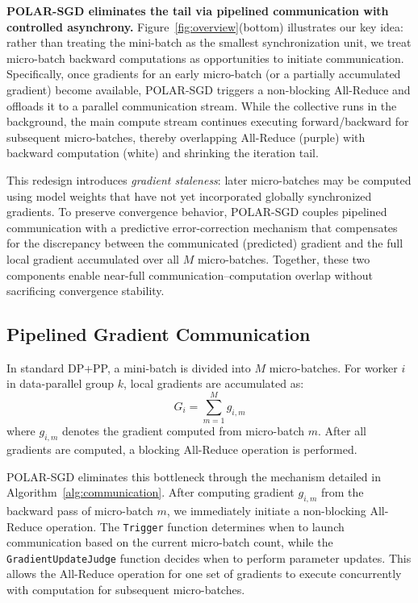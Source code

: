 \textbf{POLAR-SGD eliminates the tail via pipelined communication with controlled asynchrony.}
Figure~\ref{fig:overview}(bottom) illustrates our key idea: rather than treating the mini-batch as the smallest synchronization unit, we treat micro-batch backward computations as opportunities to initiate communication. Specifically, once gradients for an early micro-batch (or a partially accumulated gradient) become available, POLAR-SGD triggers a non-blocking All-Reduce and offloads it to a parallel communication stream. While the collective runs in the background, the main compute stream continues executing forward/backward for subsequent micro-batches, thereby overlapping All-Reduce (purple) with backward computation (white) and shrinking the iteration tail.

This redesign introduces \emph{gradient staleness}: later micro-batches may be computed using model weights that have not yet incorporated globally synchronized gradients. To preserve convergence behavior, POLAR-SGD couples pipelined communication with a predictive error-correction mechanism that compensates for the discrepancy between the communicated (predicted) gradient and the full local gradient accumulated over all $M$ micro-batches. Together, these two components enable near-full communication--computation overlap without sacrificing convergence stability.

\subsection{Pipelined Gradient Communication}

In standard DP+PP, a mini-batch is divided into $M$ micro-batches. For worker $i$ in data-parallel group $k$, local gradients are accumulated as:
\begin{equation}
    G_i = \sum_{m=1}^{M} g_{i,m}
\end{equation}
where $g_{i,m}$ denotes the gradient computed from micro-batch $m$. After all gradients are computed, a blocking All-Reduce operation is performed.

POLAR-SGD eliminates this bottleneck through the mechanism detailed in Algorithm~\ref{alg:communication}.  After computing gradient $g_{i,m}$ from the backward pass of micro-batch $m$, we immediately initiate a non-blocking All-Reduce operation.  The \texttt{Trigger} function determines when to launch communication based on the current micro-batch count, while the \texttt{GradientUpdateJudge} function decides when to perform parameter updates.  This allows the All-Reduce operation for one set of gradients to execute concurrently with computation for subsequent micro-batches.


